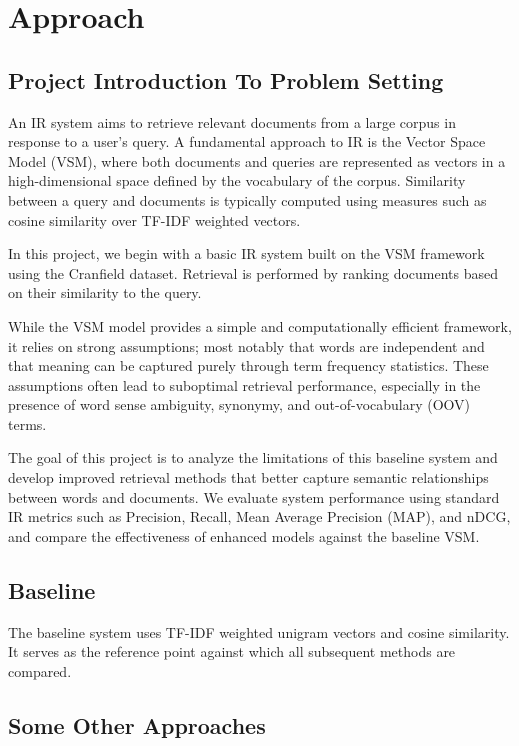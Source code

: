 \section{Approach}\label{sec:approach}

\subsection{Project Introduction To Problem Setting}
An IR system aims to retrieve relevant documents from a large corpus in response to a user's query. A fundamental approach to IR is the Vector Space Model (VSM), where both documents and queries are represented as vectors in a high-dimensional space defined by the vocabulary of the corpus. Similarity between a query and documents is typically computed using measures such as cosine similarity over TF-IDF weighted vectors.

In this project, we begin with a basic IR system built on the VSM framework using the Cranfield dataset. Retrieval is performed by ranking documents based on their similarity to the query.

While the VSM model provides a simple and computationally efficient framework, it relies on strong assumptions; most notably that words are independent and that meaning can be captured purely through term frequency statistics. These assumptions often lead to suboptimal retrieval performance, especially in the presence of word sense ambiguity, synonymy, and out-of-vocabulary (OOV) terms.

The goal of this project is to analyze the limitations of this baseline system and develop improved retrieval methods that better capture semantic relationships between words and documents. We evaluate system performance using standard IR metrics such as Precision, Recall, Mean Average Precision (MAP), and nDCG, and compare the effectiveness of enhanced models against the baseline VSM.

\subsection{Baseline}
The baseline system uses TF-IDF weighted unigram vectors and cosine similarity. It serves as the reference point against which all subsequent methods are compared.

\subsection{Some Other Approaches}

